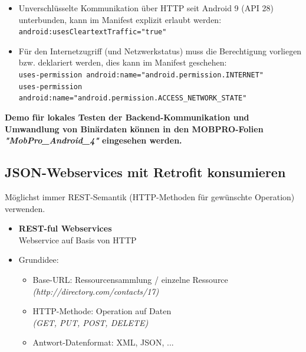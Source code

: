 \documentclass[a4paper]{article}
\begin{document}
		\begin{itemize}
			\item Unverschlüsselte Kommunikation über HTTP seit Android 9 (API 28) unterbunden, kann im Manifest explizit erlaubt werden:\\
			\texttt{android:usesCleartextTraffic="true"}
			
			\item Für den Internetzugriff (und Netzwerkstatus) muss die Berechtigung vorliegen bzw. deklariert werden, dies kann im Manifest geschehen:\\
			\texttt{uses-permission android:name="android.permission.INTERNET"}\\
			\texttt{uses-permission android:name="android.permission.ACCESS\_NETWORK\_STATE"}
		\end{itemize}
		\vspace{1em}
		\textbf{Demo für lokales Testen der Backend-Kommunikation und Umwandlung von Binärdaten können in den MOBPRO-Folien \textit{"MobPro\_Android\_4"} eingesehen werden.}	
		
	\newpage	
	\subsection{JSON-Webservices mit Retrofit konsumieren}
	
	Möglichst immer REST-Semantik (HTTP-Methoden für gewünschte Operation) verwenden.\\
	
	\begin{itemize}
		\item \textbf{REST-ful Webservices}\\
				Webservice auf Basis von HTTP
				
		\item Grundidee:
		
		\begin{itemize}
			\item Base-URL: Ressourcensammlung / einzelne Ressource\\
					\textit{(http://directory.com/contacts/{17})}
			
			\item HTTP-Methode: Operation auf Daten\\
					\textit{(GET, PUT, POST, DELETE)}
			
			\item Antwort-Datenformat: XML, JSON, ...
		\end{itemize}
	\end{itemize}
\end{document}
